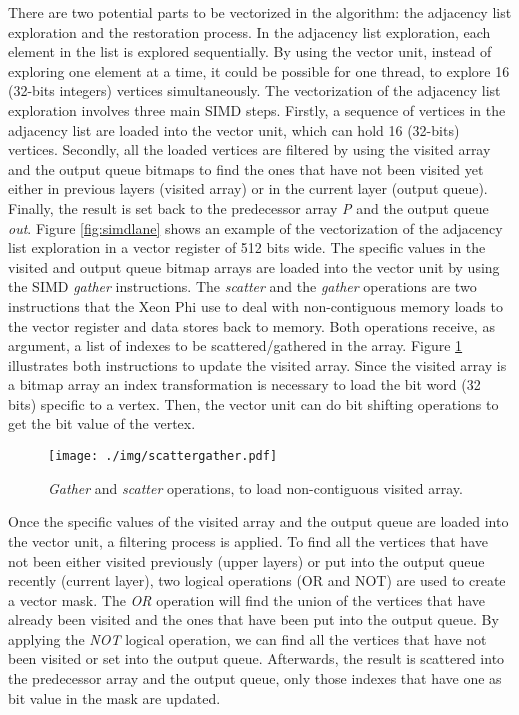 \documentclass{sig-alternate-05-2015}
\begin{document}
There are two potential parts to be vectorized in the algorithm: the adjacency list exploration and the restoration process. In the adjacency list exploration, each element in the list is explored sequentially. By using the vector unit, instead of exploring one element at a time, it could be possible for one thread, to explore 16 (32-bits integers) vertices simultaneously. The vectorization of the adjacency list exploration involves three main SIMD steps. Firstly, a sequence of vertices in the adjacency list are loaded into the vector unit, which can hold 16 (32-bits) vertices. Secondly, all the loaded vertices are filtered by using the visited array and the output queue bitmaps to find the ones that have not been visited yet either in previous layers (visited array) or in the current layer (output queue). 
Finally, the result is set back to the predecessor array \textit{P} and the output queue \textit{out}. Figure \ref{fig:simdlane} shows an example of the vectorization of the adjacency list exploration in a vector register of 512 bits wide. The specific values in the visited and output queue bitmap arrays are loaded into the vector unit by using the SIMD \textit{gather} instructions. The \textit{scatter} and the \textit{gather} operations are two instructions that the Xeon Phi use to deal with non-contiguous memory loads to the vector register and data stores back to memory. Both operations receive, as argument, a list of indexes to be scattered/gathered in the array. Figure \ref{fig:gather_scatter} illustrates both instructions to update the visited array. Since the visited array is a bitmap array an index transformation is necessary to load the bit word (32 bits) specific to a vertex. Then, the vector unit can do bit shifting operations to get the bit value of the vertex.
\begin{figure}[h!]
\centering
\texttt{[image: ./img/scattergather.pdf]}
\caption{\textit{Gather} and \textit{scatter} operations, to load non-contiguous visited array.}
\label{fig:gather_scatter}
\vspace{-3mm}
\end{figure}


Once the specific values of the visited array and the output queue are loaded into the vector unit, a filtering process is applied. To find all the vertices that have not been either visited previously (upper layers) or put into the output queue recently (current layer), two logical operations (OR and NOT) are used to create a vector mask. The \textit{OR} operation will find the union of the vertices that have already been visited and the ones that have been put into the output queue. By applying the \textit{NOT} logical operation, we can find all the vertices that have not been visited or set into the output queue. Afterwards, the result is scattered into the predecessor array and the output queue, only those indexes that have one as bit value in the mask are updated. 
\end{document}
